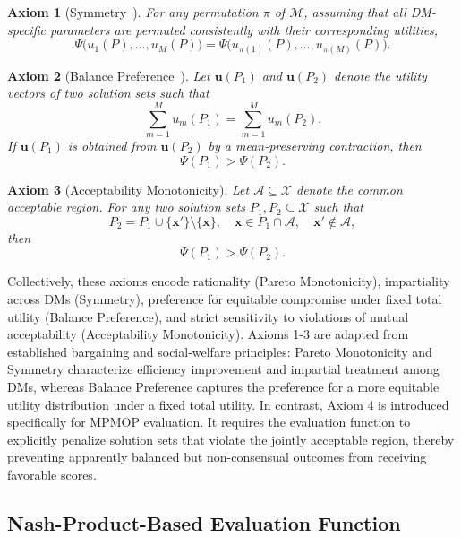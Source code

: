 \documentclass[journal]{IEEEtran}
\newtheorem{axiom}{Axiom}
\begin{document}
\begin{axiom}[Symmetry~\cite{nash1950bargaining}]
	\label{ax:symmetry}
	For any permutation $\pi$ of $\mathcal{M}$, assuming that all DM-specific parameters are permuted consistently with their corresponding utilities,
	\[
	\Psi\big(u_1(P),\dots,u_M(P)\big) = \Psi\big(u_{\pi(1)}(P),\dots,u_{\pi(M)}(P)\big).
	\]
\end{axiom}

\begin{axiom}[Balance Preference~\cite{atkinson1970measurement}]
	\label{ax:balance}
	Let $\mathbf{u}(P_1)$ and $\mathbf{u}(P_2)$ denote the utility vectors of two solution sets such that
	\[
	\sum_{m=1}^{M} u_m(P_1) = \sum_{m=1}^{M} u_m(P_2).
	\]
	If $\mathbf{u}(P_1)$ is obtained from $\mathbf{u}(P_2)$ by a mean-preserving contraction, then
	\[
	\Psi(P_1) > \Psi(P_2).
	\]
\end{axiom}

\begin{axiom}[Acceptability Monotonicity]
	\label{ax:consensus}
	Let $\mathcal{A} \subseteq \mathcal{X}$ denote the common acceptable region. 
	For any two solution sets $P_1, P_2 \subseteq \mathcal{X}$ such that
	\[
	P_2 = P_1 \cup \{\mathbf{x}'\} \setminus \{\mathbf{x}\}, \quad \mathbf{x} \in P_1 \cap \mathcal{A}, \quad \mathbf{x}' \notin \mathcal{A},
	\]
	then
	\[
	\Psi(P_1) > \Psi(P_2).
	\]
\end{axiom}

Collectively, these axioms encode rationality (Pareto Monotonicity), impartiality across DMs (Symmetry), preference for equitable compromise under fixed total utility (Balance Preference), and strict sensitivity to violations of mutual acceptability (Acceptability Monotonicity). Axioms 1-3 are adapted from established bargaining and social-welfare principles: Pareto Monotonicity and Symmetry characterize efficiency improvement and impartial treatment among DMs, whereas Balance Preference captures the preference for a more equitable utility distribution under a fixed total utility. In contrast, Axiom 4 is introduced specifically for MPMOP evaluation. It requires the evaluation function to explicitly penalize solution sets that violate the jointly acceptable region, thereby preventing apparently balanced but non-consensual outcomes from receiving favorable scores.

\subsection{Nash-Product-Based Evaluation Function}
\end{document}
